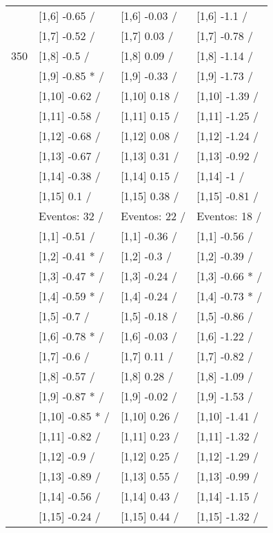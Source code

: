 \begin{table}
\begin{tabular}[t]{llll}
 & {}[1,6] -0.65  / & {}[1,6] -0.03  / & {}[1,6] -1.1  /\\
 & {}[1,7] -0.52  / & {}[1,7] 0.03  / & {}[1,7] -0.78  /\\
350 & {}[1,8] -0.5  / & {}[1,8] 0.09  / & {}[1,8] -1.14  /\\
\addlinespace
 & {}[1,9] -0.85 * / & {}[1,9] -0.33  / & {}[1,9] -1.73  /\\
 & {}[1,10] -0.62  / & {}[1,10] 0.18  / & {}[1,10] -1.39  /\\
 & {}[1,11] -0.58  / & {}[1,11] 0.15  / & {}[1,11] -1.25  /\\
 & {}[1,12] -0.68  / & {}[1,12] 0.08  / & {}[1,12] -1.24  /\\
 & {}[1,13] -0.67  / & {}[1,13] 0.31  / & {}[1,13] -0.92  /\\
\addlinespace
 & {}[1,14] -0.38  / & {}[1,14] 0.15  / & {}[1,14] -1  /\\
 & {}[1,15] 0.1  / & {}[1,15] 0.38  / & {}[1,15] -0.81  /\\
 & Eventos:  32 / & Eventos:  22 / & Eventos:  18 /\\
 & {}[1,1] -0.51  / & {}[1,1] -0.36  / & {}[1,1] -0.56  /\\
 & {}[1,2] -0.41 * / & {}[1,2] -0.3  / & {}[1,2] -0.39  /\\
\addlinespace
 & {}[1,3] -0.47 * / & {}[1,3] -0.24  / & {}[1,3] -0.66 * /\\
 & {}[1,4] -0.59 * / & {}[1,4] -0.24  / & {}[1,4] -0.73 * /\\
 & {}[1,5] -0.7  / & {}[1,5] -0.18  / & {}[1,5] -0.86  /\\
 & {}[1,6] -0.78 * / & {}[1,6] -0.03  / & {}[1,6] -1.22  /\\
 & {}[1,7] -0.6  / & {}[1,7] 0.11  / & {}[1,7] -0.82  /\\
\addlinespace
500 & {}[1,8] -0.57  / & {}[1,8] 0.28  / & {}[1,8] -1.09  /\\
 & {}[1,9] -0.87 * / & {}[1,9] -0.02  / & {}[1,9] -1.53  /\\
 & {}[1,10] -0.85 * / & {}[1,10] 0.26  / & {}[1,10] -1.41  /\\
 & {}[1,11] -0.82  / & {}[1,11] 0.23  / & {}[1,11] -1.32  /\\
 & {}[1,12] -0.9  / & {}[1,12] 0.25  / & {}[1,12] -1.29  /\\
\addlinespace
 & {}[1,13] -0.89  / & {}[1,13] 0.55  / & {}[1,13] -0.99  /\\
 & {}[1,14] -0.56  / & {}[1,14] 0.43  / & {}[1,14] -1.15  /\\
 & {}[1,15] -0.24  / & {}[1,15] 0.44  / & {}[1,15] -1.32  /\\
\bottomrule
\end{tabular}
\end{table}
